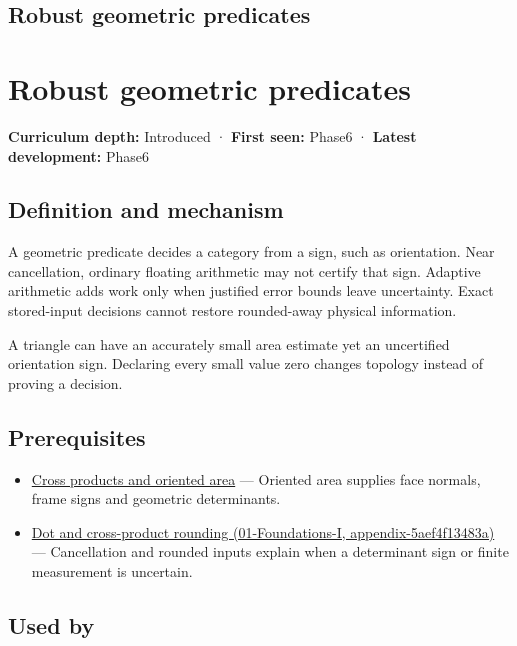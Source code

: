 \hypertarget{appendix-341296fb3f64}{}
\section*{Robust geometric predicates}
\chapter{Robust geometric predicates}\label{appendix-341296fb3f64-robust-geometric-predicates}

\textbf{Curriculum depth:} Introduced · \textbf{First seen:} Phase6 · \textbf{Latest development:} Phase6

\section{Definition and mechanism}\label{appendix-341296fb3f64-definition-and-mechanism}

A geometric predicate decides a category from a sign, such as orientation. Near cancellation, ordinary floating arithmetic may not certify that sign. Adaptive arithmetic adds work only when justified error bounds leave uncertainty. Exact stored-input decisions cannot restore rounded-away physical information.

A triangle can have an accurately small area estimate yet an uncertified orientation sign. Declaring every small value zero changes topology instead of proving a decision.

\section{Prerequisites}\label{appendix-341296fb3f64-prerequisites}

\begin{itemize}
\tightlist
\item
  \hyperref[appendix-2391db8052b1]{Cross products and oriented area} --- Oriented area supplies face normals, frame signs and geometric determinants.
\item
  \href{../01-Foundations-I/main.pdf\#nameddest=appendix-5aef4f13483a}{Dot and cross-product rounding (01-Foundations-I, appendix-5aef4f13483a)} --- Cancellation and rounded inputs explain when a determinant sign or finite measurement is uncertain.
\end{itemize}

\section{Used by}\label{appendix-341296fb3f64-used-by}

